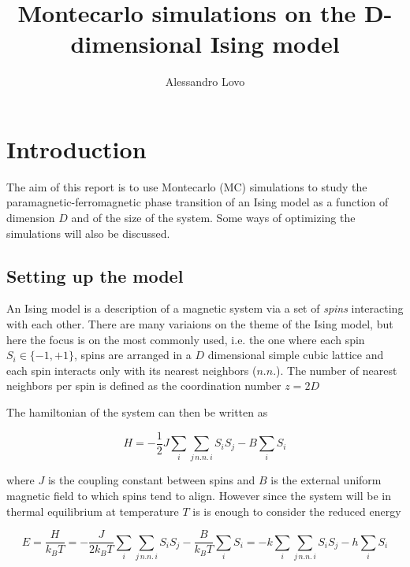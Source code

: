 \documentclass[a4paper, 11pt]{article}
\begin{document}
\title{Montecarlo simulations on the D-dimensional Ising model}
\author{Alessandro Lovo}

\maketitle


\section{Introduction}
  The aim of this report is to use Montecarlo (MC) simulations to study the paramagnetic-ferromagnetic phase transition of an Ising model as a function of dimension $D$ and of the size of the system. Some ways of optimizing the simulations will also be discussed.

  \subsection{Setting up the model}
    An Ising model is a description of a magnetic system via a set of \emph{spins} interacting with each other.
    There are many variaions on the theme of the Ising model, but here the focus is on the most commonly used, i.e. the one where each spin $S_i \in \{-1, +1\}$, spins are arranged in a $D$ dimensional simple cubic lattice and each spin interacts only with its nearest neighbors ($n.n.$).
    The number of nearest neighbors per spin is defined as the coordination number $z = 2D$

    The hamiltonian of the system can then be written as

    \begin{equation}
      H = -\frac{1}{2} J \sum_i \sum_{j \, n.n. \, i} S_i S_j - B \sum_i S_i
    \end{equation}

    where $J$ is the coupling constant between spins and $B$ is the external uniform magnetic field to which spins tend to align. However since the system will be in thermal equilibrium at temperature $T$ is is enough to consider the reduced energy

    \begin{equation}
      E = \frac{H}{k_BT} = -\frac{J}{2k_BT}  \sum_i \sum_{j \, n.n. \, i} S_i S_j - \frac{B}{k_BT} \sum_i S_i = -k\sum_i \sum_{j \, n.n. \, i} S_i S_j - h\sum_i S_i
    \end{equation}
\end{document}
